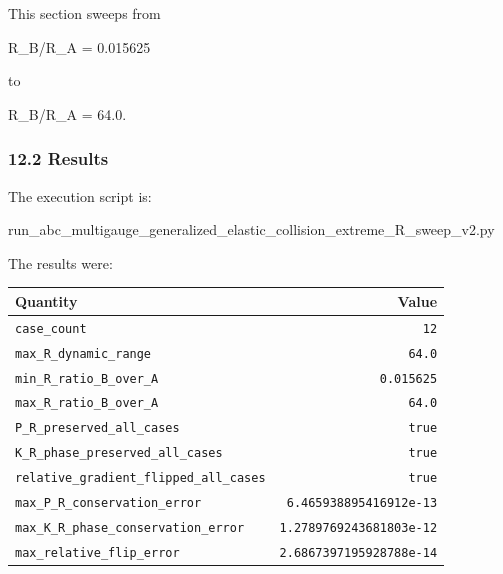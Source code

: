 \documentclass[
  a4paper,
]{article}
\newenvironment{Shaded}{}{}
\newcommand{\NormalTok}[1]{#1}
\newcounter{none} %
\begin{document}
This section sweeps from

\begin{Shaded}
\begin{Highlighting}[]
\NormalTok{R\_B/R\_A = 0.015625}
\end{Highlighting}
\end{Shaded}

to

\begin{Shaded}
\begin{Highlighting}[]
\NormalTok{R\_B/R\_A = 64.0.}
\end{Highlighting}
\end{Shaded}

\subsubsection{12.2 Results}\label{results-4}

The execution script is:

\begin{Shaded}
\begin{Highlighting}[]
\NormalTok{run\_abc\_multigauge\_generalized\_elastic\_collision\_extreme\_R\_sweep\_v2.py}
\end{Highlighting}
\end{Shaded}

The results were:

{\def\LTcaptype{none} %
\begin{longtable}[]{@{}lr@{}}
\toprule\noalign{}
Quantity & Value \\
\midrule\noalign{}
\endhead
\bottomrule\noalign{}
\endlastfoot
\texttt{case\_count} & \texttt{12} \\
\texttt{max\_R\_dynamic\_range} & \texttt{64.0} \\
\texttt{min\_R\_ratio\_B\_over\_A} & \texttt{0.015625} \\
\texttt{max\_R\_ratio\_B\_over\_A} & \texttt{64.0} \\
\texttt{P\_R\_preserved\_all\_cases} & \texttt{true} \\
\texttt{K\_R\_phase\_preserved\_all\_cases} & \texttt{true} \\
\texttt{relative\_gradient\_flipped\_all\_cases} & \texttt{true} \\
\texttt{max\_P\_R\_conservation\_error} &
\texttt{6.465938895416912e-13} \\
\texttt{max\_K\_R\_phase\_conservation\_error} &
\texttt{1.2789769243681803e-12} \\
\texttt{max\_relative\_flip\_error} & \texttt{2.6867397195928788e-14} \\
\end{longtable}
}
\end{document}
